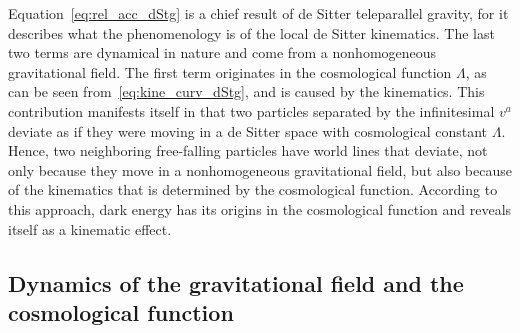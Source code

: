 \documentclass[%
aps,
prd,
reprint
]{revtex4-1}
\begin{document}
Equation~\eqref{eq:rel_acc_dStg} is a chief result of de Sitter 
teleparallel gravity, for it describes what the phenomenology is 
of the local de Sitter kinematics. The last two terms are 
dynamical in nature and come from a nonhomogeneous gravitational 
field. The first term originates in the cosmological function 
$\Lambda$, as can be seen from~\eqref{eq:kine_curv_dStg}, and is 
caused by the kinematics.  This contribution manifests itself in 
that two particles separated by the infinitesimal $v^a$ deviate 
as if they were moving in a de Sitter space with cosmological 
constant $\Lambda$. Hence, two neighboring free-falling particles 
have world lines that deviate, not only because they move in 
a nonhomogeneous gravitational field, but also because of the 
kinematics that is determined by the cosmological function.  
According to this approach, dark energy has its origins in the 
cosmological function and reveals itself as a kinematic effect.

\subsection{Dynamics of the gravitational field and the 
  cosmological function}
\label{ssec:dyn_grav_field}
\end{document}
